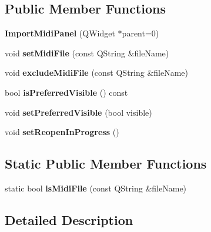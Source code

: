 \subsection*{Public Member Functions}
\begin{DoxyCompactItemize}
\item 
\mbox{\label{class_ms_1_1_import_midi_panel_a7eacf4913fb459c7ac5033839394a2b7}} 
{\bfseries Import\+Midi\+Panel} (Q\+Widget $\ast$parent=0)
\item 
\mbox{\label{class_ms_1_1_import_midi_panel_a3c972616155352da6988229038f7f2e0}} 
void {\bfseries set\+Midi\+File} (const Q\+String \&file\+Name)
\item 
\mbox{\label{class_ms_1_1_import_midi_panel_ac088e2cda1a4509cfd4a7331ba4ceb0d}} 
void {\bfseries exclude\+Midi\+File} (const Q\+String \&file\+Name)
\item 
\mbox{\label{class_ms_1_1_import_midi_panel_a31c7401b886a6bdbcb4fe36940c07c27}} 
bool {\bfseries is\+Preferred\+Visible} () const
\item 
\mbox{\label{class_ms_1_1_import_midi_panel_a8b07a37e5cd831d60245816124b8ab79}} 
void {\bfseries set\+Preferred\+Visible} (bool visible)
\item 
\mbox{\label{class_ms_1_1_import_midi_panel_a18a59537708d89cf12885aaea31d4271}} 
void {\bfseries set\+Reopen\+In\+Progress} ()
\end{DoxyCompactItemize}
\subsection*{Static Public Member Functions}
\begin{DoxyCompactItemize}
\item 
\mbox{\label{class_ms_1_1_import_midi_panel_aafc78f111a368a65738766537a223e44}} 
static bool {\bfseries is\+Midi\+File} (const Q\+String \&file\+Name)
\end{DoxyCompactItemize}


\subsection{Detailed Description}



